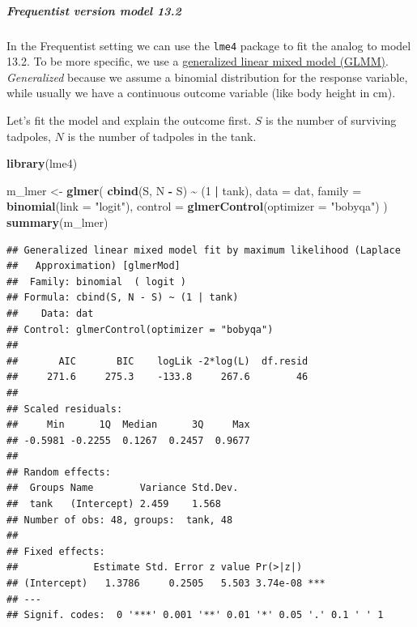 \documentclass[
]{article}
\newenvironment{Shaded}{\begin{snugshade}}{\end{snugshade}}
\newcommand{\AttributeTok}[1]{\textcolor[rgb]{0.13,0.29,0.53}{#1}}
\newcommand{\DecValTok}[1]{\textcolor[rgb]{0.00,0.00,0.81}{#1}}
\newcommand{\FunctionTok}[1]{\textcolor[rgb]{0.13,0.29,0.53}{\textbf{#1}}}
\newcommand{\NormalTok}[1]{#1}
\newcommand{\OtherTok}[1]{\textcolor[rgb]{0.56,0.35,0.01}{#1}}
\newcommand{\SpecialCharTok}[1]{\textcolor[rgb]{0.81,0.36,0.00}{\textbf{#1}}}
\newcommand{\StringTok}[1]{\textcolor[rgb]{0.31,0.60,0.02}{#1}}
\begin{document}
\subparagraph{Frequentist version model 13.2}\label{frequentist13_2}

In the Frequentist setting we can use the \texttt{lme4} package to fit
the analog to model 13.2. To be more specific, we use a
\href{https://en.wikipedia.org/wiki/Generalized_linear_mixed_model}{generalized
linear mixed model (GLMM)}. \emph{Generalized} because we assume a
binomial distribution for the response variable, while usually we have a
continuous outcome variable (like body height in cm).

Let's fit the model and explain the outcome first. \(S\) is the number
of surviving tadpoles, \(N\) is the number of tadpoles in the tank.

\begin{Shaded}
\begin{Highlighting}[]
\FunctionTok{library}\NormalTok{(lme4)}

\NormalTok{m\_lmer }\OtherTok{\textless{}{-}} \FunctionTok{glmer}\NormalTok{(}
  \FunctionTok{cbind}\NormalTok{(S, N }\SpecialCharTok{{-}}\NormalTok{ S) }\SpecialCharTok{\textasciitilde{}}\NormalTok{ (}\DecValTok{1} \SpecialCharTok{|}\NormalTok{ tank),}
  \AttributeTok{data =}\NormalTok{ dat,}
  \AttributeTok{family =} \FunctionTok{binomial}\NormalTok{(}\AttributeTok{link =} \StringTok{"logit"}\NormalTok{),}
  \AttributeTok{control =} \FunctionTok{glmerControl}\NormalTok{(}\AttributeTok{optimizer =} \StringTok{"bobyqa"}\NormalTok{)}
\NormalTok{)}
\FunctionTok{summary}\NormalTok{(m\_lmer)}
\end{Highlighting}
\end{Shaded}

\begin{verbatim}
## Generalized linear mixed model fit by maximum likelihood (Laplace
##   Approximation) [glmerMod]
##  Family: binomial  ( logit )
## Formula: cbind(S, N - S) ~ (1 | tank)
##    Data: dat
## Control: glmerControl(optimizer = "bobyqa")
## 
##       AIC       BIC    logLik -2*log(L)  df.resid 
##     271.6     275.3    -133.8     267.6        46 
## 
## Scaled residuals: 
##     Min      1Q  Median      3Q     Max 
## -0.5981 -0.2255  0.1267  0.2457  0.9677 
## 
## Random effects:
##  Groups Name        Variance Std.Dev.
##  tank   (Intercept) 2.459    1.568   
## Number of obs: 48, groups:  tank, 48
## 
## Fixed effects:
##             Estimate Std. Error z value Pr(>|z|)    
## (Intercept)   1.3786     0.2505   5.503 3.74e-08 ***
## ---
## Signif. codes:  0 '***' 0.001 '**' 0.01 '*' 0.05 '.' 0.1 ' ' 1
\end{verbatim}
\end{document}
